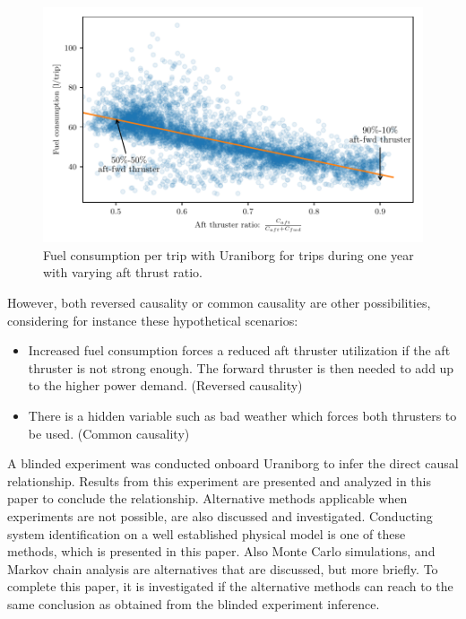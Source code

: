 \documentclass[fleqn,10pt]{olplainarticle}
\begin{document}
\begin{figure}[!htb]
    \centering
    \includegraphics[width=\textwidth]{figures/correlation.pdf}
    \caption{Fuel consumption per trip with Uraniborg for trips during one year with varying aft thrust ratio.}
    \label{fig:fuel_consumption_correlation}
\end{figure}
However, both reversed causality or common causality are other possibilities, considering for instance these hypothetical scenarios:
\begin{itemize}
    \item Increased fuel consumption forces a reduced aft thruster utilization if the aft thruster is not strong enough. The forward thruster is then needed to add up to the higher power demand. (Reversed causality)
    
    \item There is a hidden variable such as bad weather which forces both thrusters to be used. (Common causality)
\end{itemize}

A blinded experiment was conducted onboard Uraniborg to infer the direct causal relationship. Results from this experiment are presented and analyzed in this paper to conclude the relationship. Alternative methods applicable when experiments are not possible, are also discussed and investigated. Conducting system identification on a well established physical model is one of these methods, which is presented in this paper. Also Monte Carlo simulations, and Markov chain analysis are alternatives that are discussed, but more briefly. To complete this paper, it is investigated if the alternative methods can reach to the same conclusion as obtained from the blinded experiment inference. 
\end{document}
